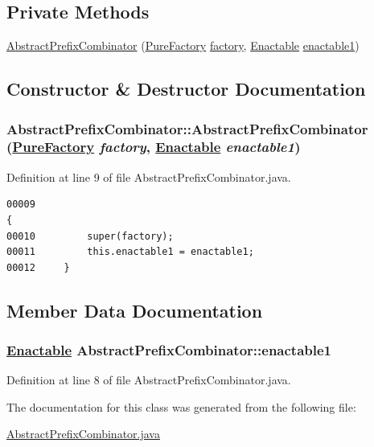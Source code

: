 \subsection*{Private Methods}
\begin{CompactItemize}
\item 
\hyperlink{classAbstractPrefixCombinator_c0}{Abstract\-Prefix\-Combinator} (\hyperlink{classPureFactory}{Pure\-Factory} \hyperlink{classDataImpl_o0}{factory}, \hyperlink{interfaceEnactable}{Enactable} \hyperlink{classAbstractPrefixCombinator_n0}{enactable1})
\end{CompactItemize}


\subsection{Constructor \& Destructor Documentation}
\hypertarget{classAbstractPrefixCombinator_c0}{
\subsubsection[AbstractPrefixCombinator]{\setlength{\rightskip}{0pt plus 5cm}Abstract\-Prefix\-Combinator::Abstract\-Prefix\-Combinator (\hyperlink{classPureFactory}{Pure\-Factory} {\em factory}, \hyperlink{interfaceEnactable}{Enactable} {\em enactable1})}}
\label{classAbstractPrefixCombinator_c0}




Definition at line 9 of file Abstract\-Prefix\-Combinator.java.\footnotesize\begin{verbatim}00009                                                                         {
00010         super(factory);
00011         this.enactable1 = enactable1;
00012     }
\end{verbatim}\normalsize 


\subsection{Member Data Documentation}
\hypertarget{classAbstractPrefixCombinator_n0}{
\subsubsection[enactable1]{\setlength{\rightskip}{0pt plus 5cm}\hyperlink{interfaceEnactable}{Enactable} Abstract\-Prefix\-Combinator::enactable1}}
\label{classAbstractPrefixCombinator_n0}




Definition at line 8 of file Abstract\-Prefix\-Combinator.java.

The documentation for this class was generated from the following file:\begin{CompactItemize}
\item 
\hyperlink{AbstractPrefixCombinator_8java-source}{Abstract\-Prefix\-Combinator.java}\end{CompactItemize}
